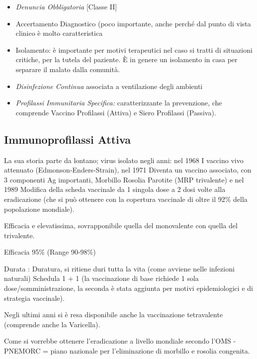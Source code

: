 \begin{itemize}
\item
  \emph{Denuncia Obbligatoria} {[}Classe II{]}
\item
  Accertamento Diagnostico (poco importante, anche perché dal punto di
  vista clinico è molto caratteristica
\item
  Isolamento: è importante per motivi terapeutici nel caso si tratti di
  situazioni critiche, per la tutela del paziente. È in genere un
  isolamento in casa per separare il malato dalla comunità.
\item
  \emph{Disinfezione Continua} associata a ventilazione degli ambienti
\item
  \emph{Profilassi Immunitaria Specifica:} caratterizzante la
  prevenzione, che comprende Vaccino Profilassi (Attiva) e Siero
  Profilassi (Passiva).
\end{itemize}

\subsection{Immunoprofilassi Attiva}

La sua storia parte da lontano; virus
isolato negli anni: nel 1968 I vaccino vivo attenuato
(Edmonson-Enders-Strain), nel 1971 Diventa un vaccino associato, con 3
componenti Ag importanti, Morbillo Rosolia Parotite (MRP trivalente) e
nel 1989 Modifica della scheda vaccinale da 1 singola dose a 2 dosi
volte alla eradicazione (che si può ottenere con la copertura vaccinale
di oltre il 92\% della popolazione mondiale).

Efficacia e elevatissima, sovrapponibile quella del monovalente con
quella del trivalente.

Efficacia 95\% (Range 90-98\%)

Durata : Duratura, si ritiene duri tutta la vita (come avviene nelle
infezioni naturali) Schedula 1 + 1 (la vaccinazione di base richiede 1
sola dose/somministrazione, la seconda è stata aggiunta per motivi
epidemiologici e di strategia vaccinale).

Negli ultimi anni si è resa disponibile anche la vaccinazione
tetravalente (comprende anche la Varicella).

Come si vorrebbe ottenere l'eradicazione a livello mondiale secondo
l'OMS - PNEMORC = piano nazionale per l'eliminazione di morbillo e
rosolia congenita.

